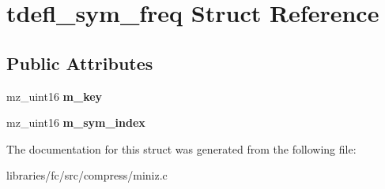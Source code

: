 \hypertarget{structtdefl__sym__freq}{}\section{tdefl\+\_\+sym\+\_\+freq Struct Reference}
\label{structtdefl__sym__freq}
\subsection*{Public Attributes}
\begin{DoxyCompactItemize}
\item 
\mbox{\label{structtdefl__sym__freq_ab3e92f7d87da65857f18f8b8fb0a6ecb}} 
mz\+\_\+uint16 {\bfseries m\+\_\+key}
\item 
\mbox{\label{structtdefl__sym__freq_a17b56e7162419d3ea5fe175d3f1c855e}} 
mz\+\_\+uint16 {\bfseries m\+\_\+sym\+\_\+index}
\end{DoxyCompactItemize}


The documentation for this struct was generated from the following file\+:\begin{DoxyCompactItemize}
\item 
libraries/fc/src/compress/miniz.\+c\end{DoxyCompactItemize}
